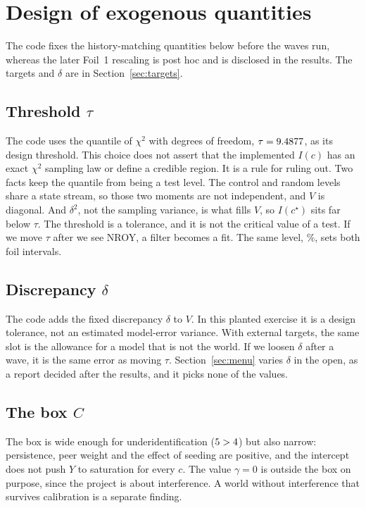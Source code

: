 \documentclass[11pt]{article}
\begin{document}
\section{Design of exogenous quantities}
\label{sec:exo}

The code fixes the history-matching quantities below before the waves
run, whereas the later Foil~1 rescaling is post hoc and is disclosed in
the results. The targets and $\delta$ are in Section~\ref{sec:targets}.

\subsection{Threshold \texorpdfstring{$\tau$}{tau}}
The code uses the \Confidence{} quantile of $\chi^2$ with \NMoments{} degrees of
freedom, $\tau=9.4877$, as its design threshold. This choice does not
assert that the implemented $I(c)$ has an exact $\chi^2$ sampling law
or define a credible region. It is a rule for ruling out. Two facts keep
the quantile from being a test level. The control and random levels share
a state stream, so those two moments are not independent, and $V$ is
diagonal. And $\delta^2$, not the sampling variance, is what fills $V$, so
$I(c^\star)$ sits far below $\tau$. The threshold is a tolerance, and it is not the
critical value of a test. If we move $\tau$ after we see NROY, a filter becomes a fit. The same level, \ConfidencePct\%, sets both foil intervals.

\subsection{Discrepancy \texorpdfstring{$\delta$}{delta}}
The code adds the fixed discrepancy $\delta$ to $V$.
In this planted exercise it is a design tolerance, not an estimated
model-error variance. With external targets, the same slot is the
allowance for a model that is not the world. If we loosen $\delta$ after a wave, it is the same error as moving $\tau$.
Section~\ref{sec:menu} varies $\delta$ in the open, as a report decided
after the results, and it picks none of the values.

\subsection{The box \texorpdfstring{$C$}{C}}
The box is wide enough for underidentification ($5>4$) but also narrow:
persistence, peer weight and the effect of seeding are positive, and the
intercept does not push $Y$ to saturation for every $c$. The value $\gamma=0$
is outside the box on purpose, since the project is about interference.
A world without interference that survives calibration is a separate
finding.
\end{document}
